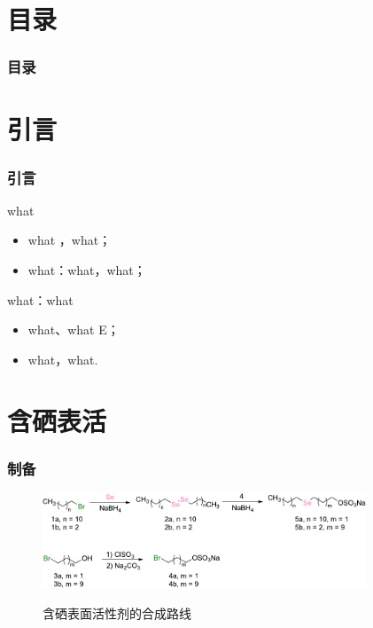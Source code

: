 \documentclass[10pt,aspectratio=43,mathserif]{beamer}
\title[含硒表面活性剂囊泡的构筑与性质研究]{\fontsize{13pt}{18pt}\selectfont {含硒表面活性剂囊泡的构筑与性质研究}}
\subtitle{\fontsize{9pt}{14pt}\selectfont \textbf{毕业论文答辩}}
\author[陈育明]{
    陈育明  \\\medskip
    {\small {应用化学1502班}}
}
\institute[SCME]{
  化学与材料工程学院\\
  江南大学}
\date[2019年6月8日]{
 2019年6月8日}
\begin{document}
\begin{frame}
\titlepage
\end{frame}				%



\section*{目录}

		\begin{frame}
		\frametitle{目录}
		\tableofcontents
		\end{frame}				%

\section{引言}

    \begin{frame}
    \frametitle{引言}
    \begin{block}{what}
        \begin{itemize}
        \item what ，what；
        \item what：what，what；
        \end{itemize}
    \end{block}
    \begin{block}{what：what\footnotemark[1]}
        \begin{itemize}
        \item what、what E；
        \item what，what. 
        \end{itemize}
    \end{block}
    \end{frame}

\section[制备]{含硒表活}

 \begin{frame}
\frametitle{制备}
    \begin{figure}[htbp]
    \centering
    \includegraphics[width=0.86\textwidth]{figure/synthesis-scheme.pdf}\\
    \caption{含硒表面活性剂的合成路线}\label{fig:synthesis}
\end{figure}
\end{frame}
\end{document}
